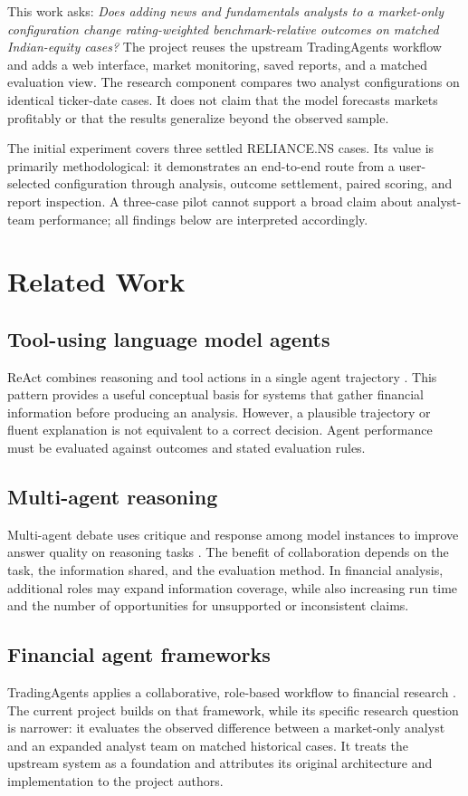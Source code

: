 \documentclass[10pt]{article}
\begin{document}
This work asks: \emph{Does adding news and fundamentals analysts to a market-only configuration change rating-weighted benchmark-relative outcomes on matched Indian-equity cases?} The project reuses the upstream TradingAgents workflow and adds a web interface, market monitoring, saved reports, and a matched evaluation view. The research component compares two analyst configurations on identical ticker-date cases. It does not claim that the model forecasts markets profitably or that the results generalize beyond the observed sample.

The initial experiment covers three settled RELIANCE.NS cases. Its value is primarily methodological: it demonstrates an end-to-end route from a user-selected configuration through analysis, outcome settlement, paired scoring, and report inspection. A three-case pilot cannot support a broad claim about analyst-team performance; all findings below are interpreted accordingly.

\section{Related Work}
\subsection{Tool-using language model agents}
ReAct combines reasoning and tool actions in a single agent trajectory \citep{yao2023react}. This pattern provides a useful conceptual basis for systems that gather financial information before producing an analysis. However, a plausible trajectory or fluent explanation is not equivalent to a correct decision. Agent performance must be evaluated against outcomes and stated evaluation rules.

\subsection{Multi-agent reasoning}
Multi-agent debate uses critique and response among model instances to improve answer quality on reasoning tasks \citep{du2023debate}. The benefit of collaboration depends on the task, the information shared, and the evaluation method. In financial analysis, additional roles may expand information coverage, while also increasing run time and the number of opportunities for unsupported or inconsistent claims.

\subsection{Financial agent frameworks}
TradingAgents applies a collaborative, role-based workflow to financial research \citep{xiao2025tradingagents}. The current project builds on that framework, while its specific research question is narrower: it evaluates the observed difference between a market-only analyst and an expanded analyst team on matched historical cases. It treats the upstream system as a foundation and attributes its original architecture and implementation to the project authors.
\end{document}
